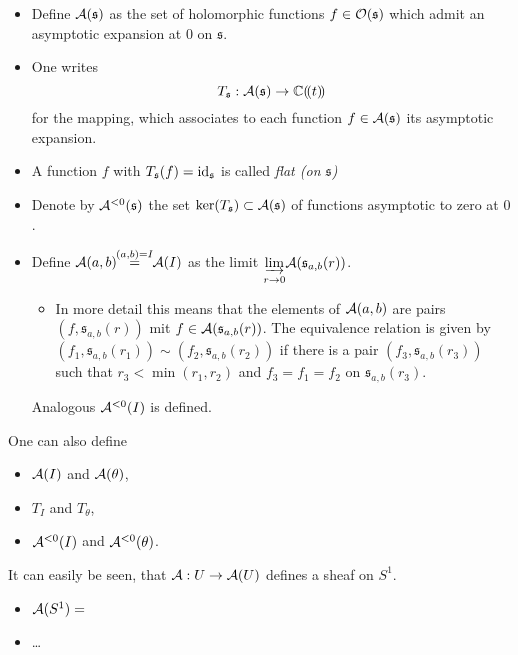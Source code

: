 \begin{notations}
  \begin{itemize}
    \item Define $\mathcal{A}(\mathfrak{s})$ as the set of holomorphic functions
      $f\in\mathcal{O}(\mathfrak{s})$ which admit an asymptotic expansion at $0$ on
      $\mathfrak{s}$.
    \item One writes
      \[
        T_{\mathfrak{s}}:\mathcal{A}(\mathfrak{s})\to\mathbb{C}(\!(t)\!)
      \]
      for the mapping, which associates to each
      function $f\in\mathcal{A}(\mathfrak{s})$ its asymptotic expansion.
    \item A function $f$ with $T_{\mathfrak{s}}(f)=\operatorname{id}_{\mathfrak{s}}$ is
      called \emph{flat (on $\mathfrak{s}$)}
    \item Denote by $\mathcal{A}^{<0}(\mathfrak{s})$ the set
      $\ker(T_{\mathfrak{s}})\subset\mathcal{A}(\mathfrak{s})$ of functions asymptotic
      to zero at $0$.
    \item Define $\mathcal{A}(a,b)\!\!\overset{(a,b)=I}{=}\!\!\mathcal{A}(I)$
      as the limit
      $\underset{r\to0}{\underrightarrow{\lim}}\mathcal{A}(\mathfrak{s}_{a,b}(r))$.
      \begin{itemize}
        \item[] In more detail this means that the elements of $\mathcal{A}(a,b)$
          are pairs $(f,\mathfrak{s}_{a,b}(r))$ mit
          $f\in\mathcal{A}(\mathfrak{s}_{a,b}(r))$. The equivalence relation is given
          by $(f_1,\mathfrak{s}_{a,b}(r_1))\sim(f_2,\mathfrak{s}_{a,b}(r_2))$
          if there is a pair $(f_3,\mathfrak{s}_{a,b}(r_3))$ such that
          $r_3<\min(r_1,r_2)$ and $f_3=f_1=f_2$ on $\mathfrak{s}_{a,b}(r_3)$.
      \end{itemize}
      Analogous $\mathcal{A}^{<0}(I)$ is defined.
  \end{itemize}
\end{notations}
\begin{rem}
  One can also define 
  \begin{itemize}
    \item $\mathcal{A}(I)$ and $\mathcal{A}(\theta)$,
    \item $T_I$ and $T_\theta$,
    \item $\mathcal{A}^{<0}(I)$ and $\mathcal{A}^{<0}(\theta)$.
  \end{itemize}
\end{rem}
It can easily be seen, that $\mathcal{A}:U\to\mathcal{A}(U)$ defines a sheaf on $S^1$.
\begin{comment}
  \begin{rem}
    $\cA_\theta=\cA(\theta)$ and $\cA^{<0}_\theta=\cA^{<0}(\theta)$.
  \end{rem}
\end{comment}
\begin{itemize}
  \item $\mathcal{A}(S^1)=$\TODO
  \item\dots
\end{itemize}

